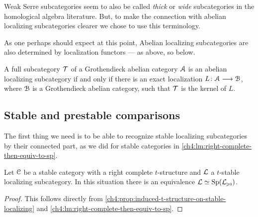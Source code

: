 \begin{remark}
    Weak Serre subcategories seem to also be called \emph{thick} or \emph{wide} subcategories in the homological algebra literature. But, to make the connection with abelian localizing subcategories clearer we chose to use this terminology. 
\end{remark}

As one perhaps should expect at this point, Abelian localizing subcategories are also determined by localization functors --- as above, so below. 

\begin{proposition}
    \label{ch4:prop:abelian-localizing-iff-kernel-of-localization}
    A full subcategory $\mathcal{T}$ of a Grothendieck abelian category $\EuScript{A}$ is an abelian localizing subcategory if and only if there is an exact localization $L\colon\EuScript{A}\longrightarrow \EuScript{B}$, where $\EuScript{B}$ is a Grothendieck abelian category, such that $\mathcal{T}$ is the kernel of $L$. 
\end{proposition}







\subsection{Stable and prestable comparisons}

The first thing we need is to be able to recognize stable localizing subcategories by their connected part, as we did for stable categories in \cref{ch4:lm:right-complete-then-equiv-to-sp}. 

\begin{corollary}
    \label{ch4:cor:t-stable-implies-equiv-to-sp}
    Let $\EuScript{C}$ be a stable category with a right complete $t$-structure and $\mathcal{L}$ a $t$-stable localizing subcategory. In this situation there is an equivalence $\mathcal{L}\simeq \mathrm{Sp}(\mathcal{L}_{\hspace{-1pt}\scriptscriptstyle\geqslant 0})$. 
\end{corollary}
\begin{proof}
    This follows directly from \cref{ch4:prop:induced-t-structure-on-stable-localizing} and \cref{ch4:lm:right-complete-then-equiv-to-sp}.
\end{proof}


